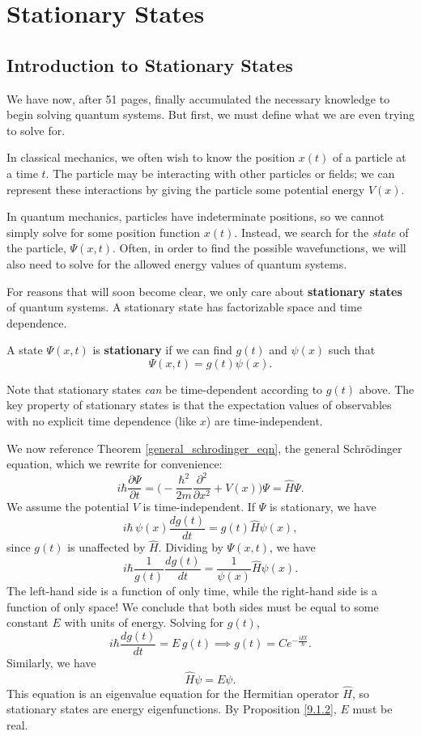 \section{Stationary States}

\subsection{Introduction to Stationary States}\label{stationary_states}

We have now, after 51 pages, finally accumulated the necessary knowledge to begin solving quantum systems. But first, we must define what we are even trying to solve for.

In classical mechanics, we often wish to know the position $x(t)$ of a particle at a time $t$. The particle may be interacting with other particles or fields; we can represent these interactions by giving the particle some potential energy $V(x)$. 

In quantum mechanics, particles have indeterminate positions, so we cannot simply solve for some position function $x(t)$. Instead, we search for the \textit{state} of the particle, $\Psi(x,t)$. Often, in order to find the possible wavefunctions, we will also need to solve for the allowed energy values of quantum systems. 

For reasons that will soon become clear, we only care about \textbf{stationary states} of quantum systems. A stationary state has factorizable space and time dependence.

\begin{frameddefn}
    A state $\Psi(x,t)$ is \textbf{stationary} if we can find $g(t)$ and $\psi(x)$ such that $$\Psi(x,t)=g(t)\psi(x).$$
\end{frameddefn}

Note that stationary states \textit{can} be time-dependent according to $g(t)$ above. The key property of stationary states is that the expectation values of observables with no explicit time dependence (like $x$) are time-independent.

We now reference Theorem \ref{general_schrodinger_eqn}, the general Schrödinger equation, which we rewrite for convenience: $$i\hbar\frac{\partial\Psi}{\partial t}=\bigg(-\frac{\hbar^2}{2m}\frac{\partial^2}{\partial x^2}+V(x)\bigg)\Psi=\hat{H}\Psi.$$We assume the potential $V$ is time-independent. If $\Psi$ is stationary, we have $$i\hbar\,\psi(x)\frac{dg(t)}{dt}=g(t)\hat{H}\psi(x),$$since $g(t)$ is unaffected by $\hat{H}$. Dividing by $\Psi(x,t)$, we have $$i\hbar\frac{1}{g(t)}\frac{dg(t)}{dt}=\frac{1}{\psi(x)}\hat{H}\psi(x).$$The left-hand side is a function of only time, while the right-hand side is a function of only space! We conclude that both sides must be equal to some constant $E$ with units of energy. Solving for $g(t)$, $$i\hbar\frac{dg(t)}{dt}=E\,g(t)\implies g(t)=Ce^{-\frac{iEt}{\hbar}}.$$Similarly, we have $$\hat{H}\psi=E\psi.$$This equation is an eigenvalue equation for the Hermitian operator $\hat{H}$, so stationary states are energy eigenfunctions. By Proposition \ref{9.1.2}, $E$ must be real.

